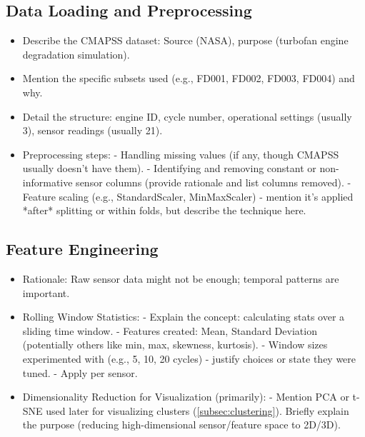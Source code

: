 
\subsection{Data Loading and Preprocessing}
\label{subsec:data_preprocessing}
\begin{itemize}
    \item Describe the CMAPSS dataset: Source (NASA), purpose (turbofan engine degradation simulation).
    \item Mention the specific subsets used (e.g., FD001, FD002, FD003, FD004) and why.
    \item Detail the structure: engine ID, cycle number, operational settings (usually 3), sensor readings (usually 21).
    \item Preprocessing steps:
        - Handling missing values (if any, though CMAPSS usually doesn't have them).
        - Identifying and removing constant or non-informative sensor columns (provide rationale and list columns removed).
        - Feature scaling (e.g., StandardScaler, MinMaxScaler) - mention it's applied *after* splitting or within folds, but describe the technique here.
\end{itemize}

\subsection{Feature Engineering}
\label{subsec:feature_engineering}
\begin{itemize}
    \item Rationale: Raw sensor data might not be enough; temporal patterns are important.
    \item Rolling Window Statistics:
        - Explain the concept: calculating stats over a sliding time window.
        - Features created: Mean, Standard Deviation (potentially others like min, max, skewness, kurtosis).
        - Window sizes experimented with (e.g., 5, 10, 20 cycles) - justify choices or state they were tuned.
        - Apply per sensor.
    \item Dimensionality Reduction for Visualization (primarily):
        - Mention PCA or t-SNE used later for visualizing clusters (\cref{subsec:clustering}). Briefly explain the purpose (reducing high-dimensional sensor/feature space to 2D/3D).
\end{itemize}

